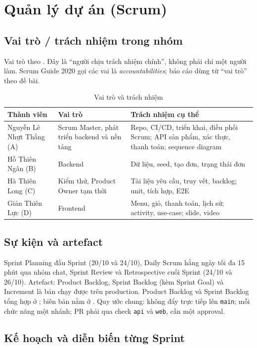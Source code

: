 \documentclass[a4paper]{article}
\begin{document}
\section{Quản lý dự án (Scrum)}\label{ch:quanly}
\subsection{Vai trò / trách nhiệm trong nhóm}\label{sec:se-vaitro}
Vai trò theo . Đây là ``người chịu trách nhiệm chính'', không phải chỉ một người làm. Scrum Guide 2020 gọi các vai là \emph{accountabilities}; báo cáo dùng từ ``vai trò'' theo đề bài.
\begin{table}[htbp]\centering
\caption{Vai trò và trách nhiệm}\label{tab:vaitro}
\begin{tabular}{@{}p{3.4cm}p{3.8cm}p{5.8cm}@{}}\toprule
\textbf{Thành viên} & \textbf{Vai trò} & \textbf{Trách nhiệm cụ thể} \\ \midrule
Nguyễn Lê Nhựt Thắng (A) & Scrum Master, phát triển backend và nền tảng & Repo, CI/CD, triển khai, điều phối Scrum; API sản phẩm, xác thực, thanh toán; sequence diagram \\
Hồ Thiên Ngân (B) & Backend & Dữ liệu, seed, tạo đơn, trạng thái đơn \\
Hà Thiên Long (C) & Kiểm thử, Product Owner tạm thời & Tài liệu yêu cầu, truy vết, backlog; unit, tích hợp, E2E \\
Giản Thiên Lực (D) & Frontend & Menu, giỏ, thanh toán, lịch sử; activity, use-case; slide, video \\
\bottomrule
\end{tabular}
\end{table}

\subsection{Sự kiện và artefact}\label{sec:se-suKien}
Sprint Planning đầu Sprint (20/10 và 24/10), Daily Scrum hằng ngày tối đa 15 phút qua nhóm chat, Sprint Review và Retrospective cuối Sprint (24/10 và 26/10). Artefact: Product Backlog, Sprint Backlog (kèm Sprint Goal) và Increment là bản chạy được trên production. Product Backlog và Sprint Backlog tổng hợp ở ; biên bản nằm ở . Quy ước chung: không đẩy trực tiếp lên \texttt{main}; mỗi chức năng một nhánh; PR phải qua check \texttt{api} và \texttt{web}, cần một approval.

\subsection{Kế hoạch và diễn biến từng Sprint}\label{sec:se-sprint}
\end{document}
